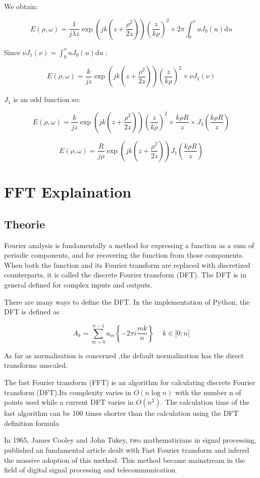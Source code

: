 \documentclass[10pt,a4paper]{article}
\begin{document}
We obtain:

\[
E(\rho,\omega)=\frac{1}{j\lambda z} \exp\left(jk\left(z+\frac{\rho^2}{2z}\right)\right)
\left(\frac{z}{k\rho}\right)^2
\times 2\pi \int_0^\nu u J_0(u) \mathrm{d}u
\]


Since $\nu J_1(\nu)=\int_0^\nu u J_0(u) \mathrm{d}u$  :

\[
E(\rho,\omega)=\frac{k}{jz} \exp\left(jk\left(z+\frac{\rho^2}{2z}\right)\right)
\left(\frac{z}{k\rho}\right)^2
\times \nu J_1(\nu)
\]

$J_1$ is an odd function so:

\[
E(\rho,\omega)=\frac{k}{jz} \exp\left(jk\left(z+\frac{\rho^2}{2z}\right)\right)
\left(\frac{z}{k\rho}\right)^2
\times \frac{k\rho R}{z} \times J_1\left(\frac{k\rho R}{z}\right)
\]

\[
E(\rho,\omega)=\frac{R}{j\rho} \exp\left(jk\left(z+\frac{\rho^2}{2z}\right)\right)
J_1\left(\frac{k\rho R}{z}\right)
\]

\section{FFT Explaination}
	\subsection{Theorie}
Fourier analysis is fundamentally a method for expressing a function as a sum of periodic components, and for recovering the function from those components. When both the function and its Fourier transform are replaced with discretized counterparts, it is called the discrete Fourier transform (DFT). The DFT is in general defined for complex inputs and outputs. 

There are many ways to define the DFT. In the implementation of Python, the DFT is defined as

\[A_k=\sum_{m=0}^{n-1}a_m\left\lbrace-2\pi i\frac{mk}{n}\right\rbrace\
\quad
k\in[0;n[\]

As far as normalisation is concerned ,the default normalization has the direct transforms unscaled. 

The fast Fourier transform (FFT) is an algorithm for calculating discrete Fourier transform (DFT).Its complexity varies in $O(n\log n)$ with the number n of points used while a current DFT varies in $O(n^2)$. The calculation time of the fast algorithm can be 100 times shorter than the calculation using the DFT definition formula 

In 1965, James Cooley and John Tukey, two mathematicians in signal processing, published an fundamental article dealt with Fast Fourier transform and infered the massive adoption of this method. This method became mainstream in the field of digital signal processing and telecommunication.  
\end{document}
